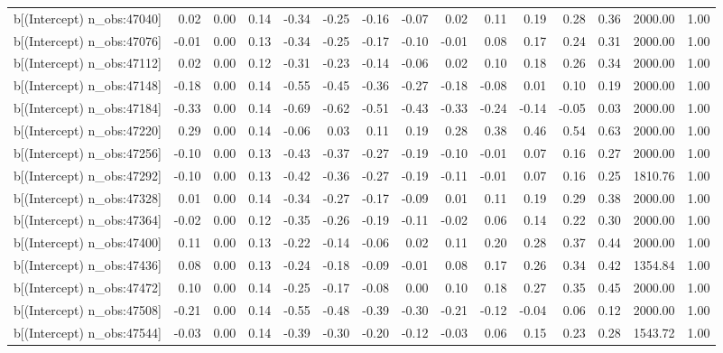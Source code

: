 \begin{table}[ht]
\begin{tabular}{rrrrrrrrrrrrrrr}
  b[(Intercept) n\_obs:47040] & 0.02 & 0.00 & 0.14 & -0.34 & -0.25 & -0.16 & -0.07 & 0.02 & 0.11 & 0.19 & 0.28 & 0.36 & 2000.00 & 1.00 \\ 
  b[(Intercept) n\_obs:47076] & -0.01 & 0.00 & 0.13 & -0.34 & -0.25 & -0.17 & -0.10 & -0.01 & 0.08 & 0.17 & 0.24 & 0.31 & 2000.00 & 1.00 \\ 
  b[(Intercept) n\_obs:47112] & 0.02 & 0.00 & 0.12 & -0.31 & -0.23 & -0.14 & -0.06 & 0.02 & 0.10 & 0.18 & 0.26 & 0.34 & 2000.00 & 1.00 \\ 
  b[(Intercept) n\_obs:47148] & -0.18 & 0.00 & 0.14 & -0.55 & -0.45 & -0.36 & -0.27 & -0.18 & -0.08 & 0.01 & 0.10 & 0.19 & 2000.00 & 1.00 \\ 
  b[(Intercept) n\_obs:47184] & -0.33 & 0.00 & 0.14 & -0.69 & -0.62 & -0.51 & -0.43 & -0.33 & -0.24 & -0.14 & -0.05 & 0.03 & 2000.00 & 1.00 \\ 
  b[(Intercept) n\_obs:47220] & 0.29 & 0.00 & 0.14 & -0.06 & 0.03 & 0.11 & 0.19 & 0.28 & 0.38 & 0.46 & 0.54 & 0.63 & 2000.00 & 1.00 \\ 
  b[(Intercept) n\_obs:47256] & -0.10 & 0.00 & 0.13 & -0.43 & -0.37 & -0.27 & -0.19 & -0.10 & -0.01 & 0.07 & 0.16 & 0.27 & 2000.00 & 1.00 \\ 
  b[(Intercept) n\_obs:47292] & -0.10 & 0.00 & 0.13 & -0.42 & -0.36 & -0.27 & -0.19 & -0.11 & -0.01 & 0.07 & 0.16 & 0.25 & 1810.76 & 1.00 \\ 
  b[(Intercept) n\_obs:47328] & 0.01 & 0.00 & 0.14 & -0.34 & -0.27 & -0.17 & -0.09 & 0.01 & 0.11 & 0.19 & 0.29 & 0.38 & 2000.00 & 1.00 \\ 
  b[(Intercept) n\_obs:47364] & -0.02 & 0.00 & 0.12 & -0.35 & -0.26 & -0.19 & -0.11 & -0.02 & 0.06 & 0.14 & 0.22 & 0.30 & 2000.00 & 1.00 \\ 
  b[(Intercept) n\_obs:47400] & 0.11 & 0.00 & 0.13 & -0.22 & -0.14 & -0.06 & 0.02 & 0.11 & 0.20 & 0.28 & 0.37 & 0.44 & 2000.00 & 1.00 \\ 
  b[(Intercept) n\_obs:47436] & 0.08 & 0.00 & 0.13 & -0.24 & -0.18 & -0.09 & -0.01 & 0.08 & 0.17 & 0.26 & 0.34 & 0.42 & 1354.84 & 1.00 \\ 
  b[(Intercept) n\_obs:47472] & 0.10 & 0.00 & 0.14 & -0.25 & -0.17 & -0.08 & 0.00 & 0.10 & 0.18 & 0.27 & 0.35 & 0.45 & 2000.00 & 1.00 \\ 
  b[(Intercept) n\_obs:47508] & -0.21 & 0.00 & 0.14 & -0.55 & -0.48 & -0.39 & -0.30 & -0.21 & -0.12 & -0.04 & 0.06 & 0.12 & 2000.00 & 1.00 \\ 
  b[(Intercept) n\_obs:47544] & -0.03 & 0.00 & 0.14 & -0.39 & -0.30 & -0.20 & -0.12 & -0.03 & 0.06 & 0.15 & 0.23 & 0.28 & 1543.72 & 1.00 \\ 

\end{tabular}
\end{table}
